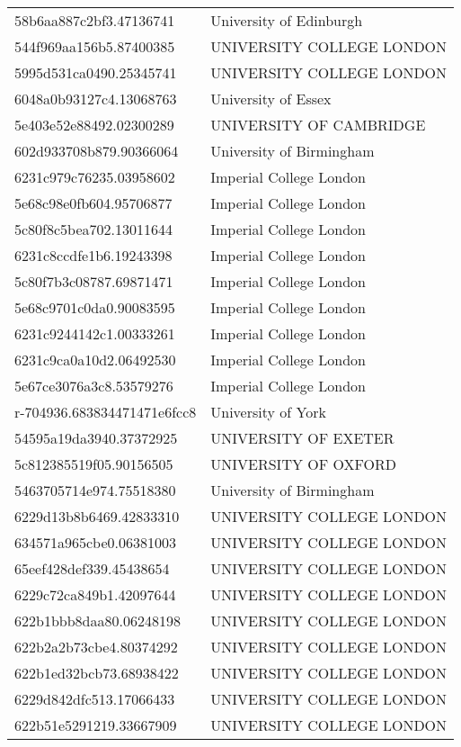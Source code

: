 \begin{tabular}{ll}
58b6aa887c2bf3.47136741 & University of Edinburgh \\
544f969aa156b5.87400385 & UNIVERSITY COLLEGE LONDON \\
5995d531ca0490.25345741 & UNIVERSITY COLLEGE LONDON \\
6048a0b93127c4.13068763 & University of Essex \\
5e403e52e88492.02300289 & UNIVERSITY OF CAMBRIDGE \\
602d933708b879.90366064 & University of Birmingham \\
6231c979c76235.03958602 & Imperial College London \\
5e68c98e0fb604.95706877 & Imperial College London \\
5c80f8c5bea702.13011644 & Imperial College London \\
6231c8ccdfe1b6.19243398 & Imperial College London \\
5c80f7b3c08787.69871471 & Imperial College London \\
5e68c9701c0da0.90083595 & Imperial College London \\
6231c9244142c1.00333261 & Imperial College London \\
6231c9ca0a10d2.06492530 & Imperial College London \\
5e67ce3076a3c8.53579276 & Imperial College London \\
r-704936.683834471471e6fcc8 & University of York \\
54595a19da3940.37372925 & UNIVERSITY OF EXETER \\
5c812385519f05.90156505 & UNIVERSITY OF OXFORD \\
5463705714e974.75518380 & University of Birmingham \\
6229d13b8b6469.42833310 & UNIVERSITY COLLEGE LONDON \\
634571a965cbe0.06381003 & UNIVERSITY COLLEGE LONDON \\
65eef428def339.45438654 & UNIVERSITY COLLEGE LONDON \\
6229c72ca849b1.42097644 & UNIVERSITY COLLEGE LONDON \\
622b1bbb8daa80.06248198 & UNIVERSITY COLLEGE LONDON \\
622b2a2b73cbe4.80374292 & UNIVERSITY COLLEGE LONDON \\
622b1ed32bcb73.68938422 & UNIVERSITY COLLEGE LONDON \\
6229d842dfc513.17066433 & UNIVERSITY COLLEGE LONDON \\
622b51e5291219.33667909 & UNIVERSITY COLLEGE LONDON \\

\end{tabular}
